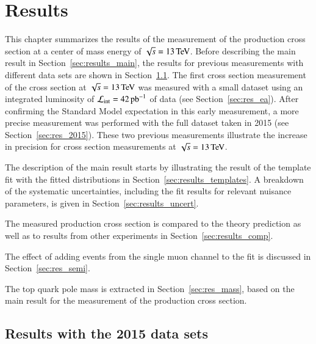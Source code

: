 
\chapter{Results}
\label{sec:res}

This chapter summarizes the results of the measurement of the \ttbar production cross section at a center of mass energy of $\sqrt{s} = 13 \,\text{Te\hspace{-.08em}V}$.
Before describing the main result in Section~\ref{sec:results_main}, the results for  previous measurements with different data sets are shown
in Section~\ref{sec:res_prev}. The first cross section measurement of the \ttbar cross section at $\sqrt{s}= 13 \,\text{Te\hspace{-.08em}V}$ was measured with a small dataset using an integrated luminosity of $\mathcal{L}_\mathrm{int}= 42 \mbox{\ensuremath{\,\text{pb}^\text{$-$1}}}$ 
of data (see Section~\ref{sec:res_ea}). After confirming the Standard Model expectation in this early measurement, a more precise measurement was performed with the full dataset taken in 2015 (see Section~\ref{sec:res_2015}).
These two previous measurements illustrate the increase in precision for \ttbar cross section measurements at $\sqrt{s} = 13  \,\text{Te\hspace{-.08em}V}$.

The description of the main result starts by illustrating the result of the template fit with the fitted distributions in Section~\ref{sec:results_templates}.
A breakdown of the systematic uncertainties, including the fit results for relevant nuisance parameters, is given in Section~\ref{sec:results_uncert}.

The measured \ttbar production cross section is compared to the theory prediction as well as to results from other experiments in Section~\ref{sec:results_comp}.

The effect of adding events from the single muon channel to the fit is discussed in Section~\ref{sec:res_semi}.

The top quark pole mass is extracted in Section~\ref{sec:res_mass}, based on the main result for the measurement of the \ttbar production cross section.




\section{Results with the 2015 data sets}
\label{sec:res_prev}

